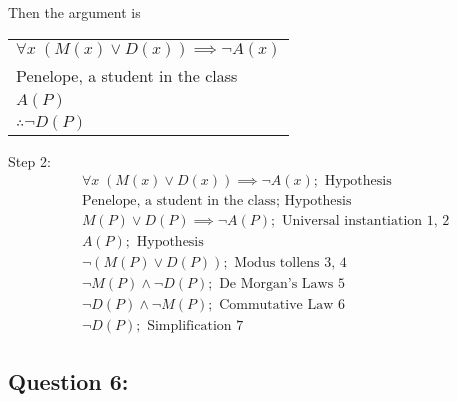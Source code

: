 \documentclass[14pt]{extreport}
\begin{document}
\begin{enumerate}
\begin{enumerate}
                Then the argument is
                \begin{tabular}{l}
                    \( \forall x \; (M(x) \lor D(x)) \implies \neg A(x) \) \\
                    Penelope, a student in the class \\
                    \( A(P) \) \\
                    \hline
                    \( \therefore \neg D(P) \)
                \end{tabular}

                \medskip

                Step 2:
                \begin{align}
                    & \forall x \; (M(x) \lor D(x)) \implies \neg A(x); \text{ Hypothesis} \\
                    & \text{Penelope, a student in the class}; \text{ Hypothesis} \\
                    & M(P) \lor D(P) \implies \neg A(P); \text{ Universal instantiation 1, 2} \\
                    & A(P); \text{ Hypothesis} \\
                    & \neg (M(P) \lor D(P)); \text{ Modus tollens 3, 4} \\
                    & \neg M(P) \land \neg D(P); \text{ De Morgan's Laws 5} \\
                    & \neg D(P) \land \neg M(P); \text{ Commutative Law 6} \\
                    & \neg D(P); \text{ Simplification 7}
                \end{align}
           
        \end{enumerate}

\end{enumerate}
\newpage

\subsection*{Question 6:}
\end{document}
